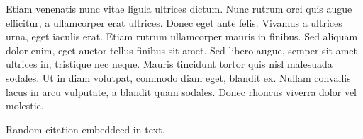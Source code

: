 Etiam venenatis nunc vitae ligula ultrices dictum. Nunc rutrum orci quis augue efficitur, a ullamcorper erat ultrices. Donec eget ante felis. Vivamus a ultrices urna, eget iaculis erat. Etiam rutrum ullamcorper mauris in finibus. Sed aliquam dolor enim, eget auctor tellus finibus sit amet. Sed libero augue, semper sit amet ultrices in, tristique nec neque. Mauris tincidunt tortor quis nisl malesuada sodales. Ut in diam volutpat, commodo diam eget, blandit ex. Nullam convallis lacus in arcu vulputate, a blandit quam sodales. Donec rhoncus viverra dolor vel molestie.

Random citation \cite{DUMMY:1} embeddeed in text.